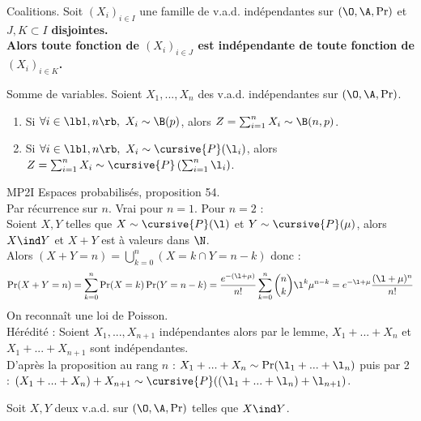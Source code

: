 \documentclass[11pt]{article}
\begin{document}
\begin{lemme}{Coalitions.}{}
    Soit $(X_i)_{i\in I}$ une famille de v.a.d. indépendantes sur $(\O,\A,\Pr)$ et $J,K\subset I$ \bf{disjointes}.\\
    Alors toute fonction de $(X_i)_{i\in J}$ est indépendante de toute fonction de $(X_i)_{i\in K}$.
\end{lemme}

\begin{prop}{Somme de variables.}{}
    Soient $X_1,...,X_n$ des v.a.d. indépendantes sur $(\O,\A,\Pr)$.
    \begin{enumerate}
        \item Si $\forall i \in \lb1,n\rb, ~ X_i \sim \B(p)$, alors $Z=\sum_{i=1}^n X_i \sim \B(n,p)$.
        \item Si $\forall i \in \lb1,n\rb, ~ X_i \sim \cursive{P}(\l_i)$, alors $Z=\sum_{i=1}^nX_i \sim \cursive{P}\left( \sum_{i=1}^n \l_i \right)$.
    \end{enumerate}
    \tcblower
     MP2I Espaces probabilisés, proposition 54.\\
     Par récurrence sur $n$. Vrai pour $n=1$. Pour $n=2$ :\\
    Soient $X,Y$ telles que $X\sim\cursive{P}(\l)$ et $Y\sim\cursive{P}(\mu)$, alors $X\ind Y$ et $X+Y$ est à valeurs dans $\N$.\\
    Alors $(X+Y = n) = \bigcup_{k=0}^n(X = k \cap Y = n - k)$ donc : \begin{equation*} \Pr(X+Y=n)=\sum_{k=0}^n\Pr(X=k)\Pr(Y=n-k)=\frac{e^{-(\l+\mu)}}{n!}\sum_{k=0}^n\binom{n}{k}\l^k\mu^{n-k} = e^{-\l + \mu} \frac{(\l+\mu)^n}{n!} \end{equation*}
    On reconnaît une loi de Poisson.\\
    Hérédité : Soient $X_1,...,X_{n+1}$ indépendantes alors par le lemme, $X_1+...+X_n$ et $X_1+...+X_{n+1}$ sont indépendantes.\\
    D'après la proposition au rang $n$ : $X_1+...+X_n \sim \Pr(\l_1+...+\l_n)$ puis par 2 : $(X_1+...+X_n)+X_{n+1}\sim\cursive{P}((\l_1+...+\l_n) + \l_{n+1})$.
\end{prop}

\begin{exercice}{}{}
    Soit $X,Y$ deux v.a.d. sur $(\O,\A,\Pr)$ telles que $X\ind Y$.
\end{exercice}
\end{document}
